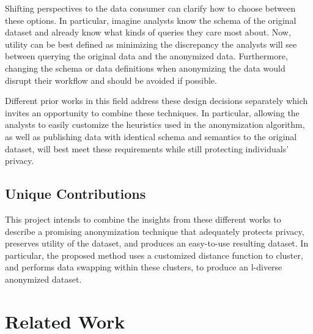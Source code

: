 Shifting perspectives to the data consumer can clarify how to choose between these options. In particular, imagine analysts know the schema of the original dataset and already know what kinds of queries they care most about. Now, utility can be best defined as minimizing the discrepancy the analysts will see between querying the original data and the anonymized data. Furthermore, changing the schema or data definitions when anonymizing the data would disrupt their workflow and should be avoided if possible.

Different prior works in this field address these design decisions separately which invites an opportunity to combine these techniques. In particular, allowing the analysts to easily customize the heuristics used in the anonymization algorithm, as well as publishing data with identical schema and semantics to the original dataset, will best meet these requirements while still protecting individuals' privacy.


\subsection{Unique Contributions}
This project intends to combine the insights from these different works to describe a promising anonymization technique that adequately protects privacy, preserves utility of the dataset, and produces an easy-to-use resulting dataset. In particular, the proposed method uses a customized distance function\cite{jiaPad} to cluster, and performs data swapping\cite{soriaSwapping} within these clusters, to produce an l-diverse\cite{machanavajjhalalDiversity} anonymized dataset.

\section{Related Work}
